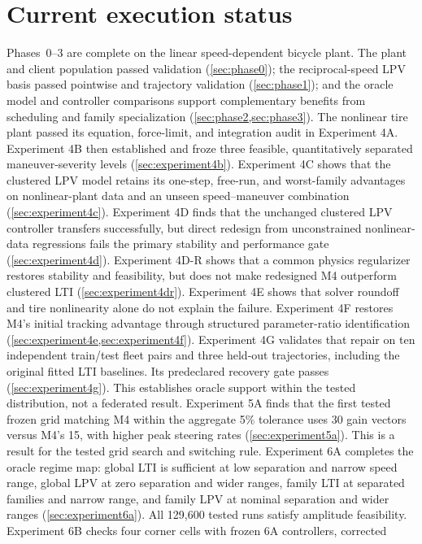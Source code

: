 \section{Current execution status}
Phases~0--3 are complete on the linear speed-dependent bicycle plant. The plant
and client population passed validation (\cref{sec:phase0}); the reciprocal-speed
LPV basis passed pointwise and trajectory validation (\cref{sec:phase1}); and the
oracle model and controller comparisons support complementary benefits from
scheduling and family specialization (\cref{sec:phase2,sec:phase3}). The
nonlinear tire plant passed its equation, force-limit, and integration audit in
Experiment 4A. Experiment 4B then established and froze three feasible,
quantitatively separated maneuver-severity levels
(\cref{sec:experiment4b}). Experiment 4C shows that the clustered LPV model
retains its one-step, free-run, and worst-family advantages on nonlinear-plant
data and an unseen speed--maneuver combination (\cref{sec:experiment4c}).
Experiment 4D finds that the unchanged clustered LPV controller transfers
successfully, but direct redesign from unconstrained nonlinear-data regressions
fails the primary stability and performance gate (\cref{sec:experiment4d}).
Experiment 4D-R shows that a
common physics regularizer restores stability and feasibility, but does not make
redesigned M4 outperform clustered LTI (\cref{sec:experiment4dr}). Experiment 4E
shows that solver roundoff and tire nonlinearity alone do not explain the failure.
Experiment 4F restores M4's initial tracking advantage through structured
parameter-ratio identification (\cref{sec:experiment4e,sec:experiment4f}).
Experiment 4G validates that repair on ten independent train/test fleet pairs
and three held-out trajectories, including the original fitted LTI baselines.
Its predeclared recovery gate passes (\cref{sec:experiment4g}). This establishes
oracle support within the tested distribution, not a federated result.
Experiment 5A finds that the first tested frozen grid matching M4 within the
aggregate 5\% tolerance uses 30 gain vectors versus M4's 15, with higher peak
steering rates (\cref{sec:experiment5a}). This is a result for the tested grid
search and switching rule. Experiment 6A completes the oracle regime map:
global LTI is sufficient at low separation and narrow speed range, global LPV
at zero separation and wider ranges, family LTI at separated families and
narrow range, and family LPV at nominal separation and wider ranges
(\cref{sec:experiment6a}). All 129,600 tested runs satisfy amplitude feasibility.
Experiment 6B checks four corner cells with frozen 6A controllers, corrected

